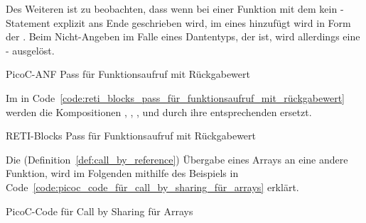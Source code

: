 Des Weiteren ist zu beobachten, dass wenn bei einer Funktion mit dem   kein -Statement explizit ans Ende geschrieben wird, im  eines hinzufügt wird in Form der  . Beim Nicht-Angeben im Falle eines Dantentyps, der   ist, wird allerdings eine - ausgelöst.

\begin{code}
  \centering
  \caption{PicoC-ANF Pass für Funktionsaufruf mit Rückgabewert}
  \label{code:picoc_mon_pass_für_funktionsaufruf_mit_rückgabewert}
\end{code}

Im  in Code~\ref{code:reti_blocks_pass_für_funktionsaufruf_mit_rückgabewert} werden die Kompositionen , , ,  und  durch ihre entsprechenden  ersetzt.

\begin{code}
  \centering
  \caption{RETI-Blocks Pass für Funktionsaufruf mit Rückgabewert}
  \label{code:reti_blocks_pass_für_funktionsaufruf_mit_rückgabewert}
\end{code}


Die  (Definition~\ref{def:call_by_reference}) Übergabe eines Arrays an eine andere Funktion, wird im Folgenden mithilfe des Beispiels in Code~\ref{code:picoc_code_für_call_by_sharing_für_arrays} erklärt.

\begin{code}
  \centering
  \caption{PicoC-Code für Call by Sharing für Arrays}
  \label{code:picoc_code_für_call_by_sharing_für_arrays}
\end{code}

